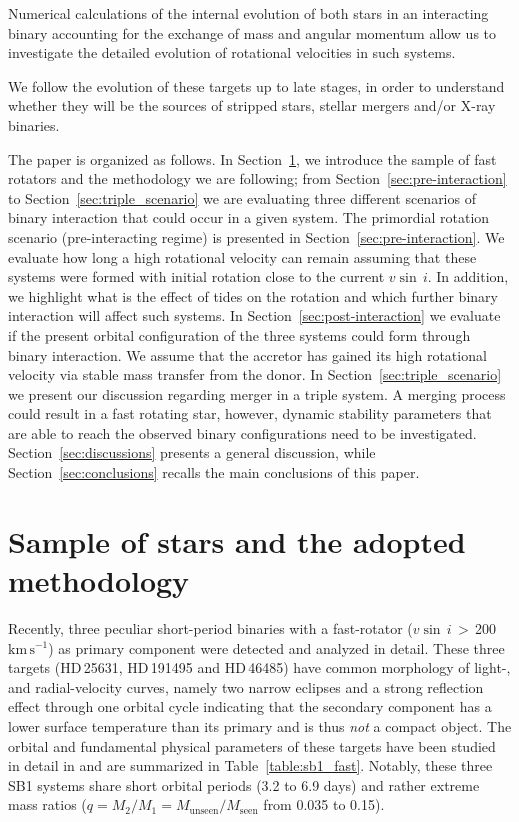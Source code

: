 \documentclass{aa}
\newcommand{\kms}{$\mathrm{km\,s^{-1}}$}
\newcommand{\vsini} {$v\sin\,i$}
\DeclareRobustCommand{\Tabref}[1]{Table~\ref{#1}}
\DeclareRobustCommand{\Secref}[1]{Section~\ref{#1}}
\begin{document}
Numerical calculations of the internal evolution of both stars in an
interacting binary accounting for the exchange of mass and angular
momentum \citep[e.g.,][]{wang:20, Badry_2021,Renzo_2021, pauli:22,
  renzo:23} allow us to investigate the detailed evolution of
rotational velocities in such systems.

We follow the evolution of these targets up to late stages, in order
to understand whether they will be the sources of stripped stars, stellar mergers and/or X-ray binaries. 

The paper is organized as follows. In \Secref{sec:sample}, we introduce the sample of fast rotators and the methodology we are following; from \Secref{sec:pre-interaction} to \Secref{sec:triple_scenario} we are evaluating three different scenarios of binary interaction that could occur in a given system.
The primordial rotation scenario (pre-interacting regime) is presented
in \Secref{sec:pre-interaction}. We evaluate how long a high
rotational velocity can remain assuming that these systems were formed
with initial rotation close to the current \vsini. In addition, we highlight what is the effect of tides on the rotation and which further binary interaction will affect such systems.
In \Secref{sec:post-interaction} we evaluate if the present orbital configuration of the three systems could form through binary interaction. We assume that the accretor has gained its high rotational velocity via stable mass transfer from the donor.
In \Secref{sec:triple_scenario} we present our discussion regarding merger in a triple system. A merging process could result in a fast rotating star, however, dynamic stability parameters that are able to reach the observed binary configurations need to be investigated. 
\Secref{sec:discussions} presents a general discussion, while \Secref{sec:conclusions} recalls the main conclusions of this paper.




\section{Sample of stars and the adopted methodology}
\label{sec:sample}



Recently, three peculiar short-period binaries with a fast-rotator
(\vsini\,$>$\,200~\kms) as primary component \citep{Naze_2023_rot}
were detected and analyzed in detail. These three targets (HD\,25631,
HD\,191495 and HD\,46485) have common morphology of light-, and
radial-velocity curves, namely two narrow eclipses and a strong
reflection effect through one orbital cycle indicating that the
secondary component has a lower surface temperature than its primary
and is thus \emph{not} a compact object. The orbital and
fundamental physical parameters of these targets have been studied in
detail in \citet{Naze_2023_rot} and are summarized in \Tabref{table:sb1_fast}. Notably, these three SB1 systems
share short orbital periods (3.2 to 6.9 days) and rather extreme
mass ratios ($q=M_2/M_1=M_\mathrm{unseen}/M_\mathrm{seen}$ from 0.035 to 0.15).
\end{document}
